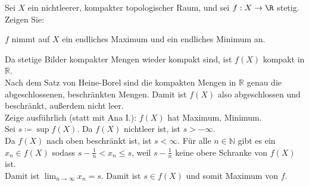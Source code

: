 \begin{assignment}
  Sei \( X \) ein nichtleerer, kompakter topologischer Raum, und sei \( f: X \to \R \) stetig. Zeigen Sie:

  \( f \) nimmt auf \( X \) ein endliches Maximum und ein endliches Minimum an.
\end{assignment}
\begin{solution}
  Da stetige Bilder kompakter Mengen wieder kompakt sind, ist \( f(X) \) kompakt in \( \mathbb{R} \). \\
  Nach dem Satz von Heine-Borel sind die kompakten Mengen in \( \mathbb{R} \) genau die abgeschlossenen, beschränkten Mengen. Damit ist \( f(X) \) also abgeschlossen und beschränkt, außerdem nicht leer. \\
  Zeige ausführlich (statt mit Ana I.): \( f(X) \) hat Maximum, Minimum. \\
  Sei \( s \coloneqq \sup f(X) \). Da \( f(X) \) nichtleer ist, ist \( s > - \infty \). \\
  Da \( f(X) \) nach oben beschränkt ist, ist \( s < \infty \).
  Für alle \( n \in \mathbb{N} \) gibt es ein \( x_n \in f(X) \) sodass \( s - \frac{1}{n} < x_n \leq s \), weil \( s - \frac{1}{n} \) keine obere Schranke von \( f(X) \) ist. \\
  Damit ist \( \lim_{n \rightarrow \infty} x_n = s \). Damit ist \( s \in f(X) \) und somit Maximum von \( f \).
\end{solution}

